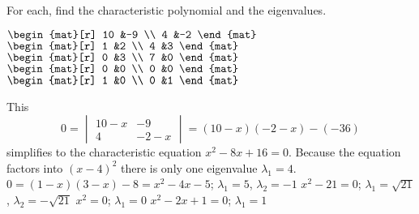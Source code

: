 \begin{exercises}
  \item 
    For each, find the characteristic polynomial and the eigenvalues.
    \begin{exparts*}
      \partsitem \( \begin{mat}[r]
                 10  &-9 \\
                  4  &-2
            \end{mat}  \)
      \partsitem $\begin{mat}[r]
                    1  &2  \\
                    4  &3  
                 \end{mat}$
      \partsitem \( \begin{mat}[r]
                  0  &3  \\
                  7 &0
                 \end{mat} \)
      \partsitem \( \begin{mat}[r]  
                  0  &0  \\
                  0  &0
            \end{mat}  \)
      \partsitem \( \begin{mat}[r]
                  1  &0  \\
                  0  &1
            \end{mat}  \)
    \end{exparts*}
    \begin{answer}
      \begin{exparts}
         \partsitem This
           \begin{equation*}
             0=
             \begin{vmatrix}
               10-x  &-9  \\
               4     &-2-x
             \end{vmatrix}
             =(10-x)(-2-x)-(-36)
           \end{equation*}
           simplifies to the characteristic equation \( x^2-8x+16=0 \). 
           Because the equation factors into $(x-4)^2$ there is
           only one eigenvalue \( \lambda_1=4 \).
         \partsitem $0=(1-x)(3-x)-8=x^2-4x-5$; $\lambda_1=5$, $\lambda_2=-1$
         \partsitem \( x^2-21=0 \); 
           \( \lambda_1=\sqrt{21} \), $\lambda_2=-\sqrt{21}$
         \partsitem \( x^2=0 \); \( \lambda_1=0 \)
         \partsitem \( x^2-2x+1=0 \); \( \lambda_1=1 \)
       \end{exparts}  
     \end{answer}

\end{exercises}

